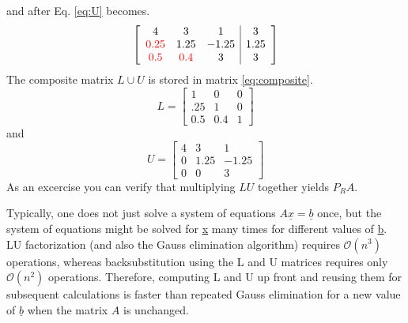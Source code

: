 \documentclass[12pt]{article}   %
\begin{document}
and after Eq. \ref{eq:U} becomes.
\begin{equation}
\left[
\begin{array}{ccc|c}
4 & 3 & 1 & 3 \\
{\color{red}0.25} & 1.25 & -1.25 & 1.25 \\
{\color{red}0.5} & {\color{red}0.4} & 3 & 3
\end{array}
\right]
\label{eq:composite}
\end{equation}
The composite matrix $L\cup U$ is stored in matrix \ref{eq:composite}.
\begin{equation}
L=\begin{bmatrix}
1 & 0 & 0 \\
.25 & 1 & 0 \\
0.5 & 0.4 & 1
\end{bmatrix}
\end{equation}
and
\begin{equation}
U=\left[
\begin{array}{ccc}
4 & 3 & 1 \\
0 & 1.25 & -1.25\\
0 & 0 & 3
\end{array}
\right]
\label{eq:U2}
\end{equation}
As an excercise you can verify that multiplying $LU$ together yields $P_RA$.

Typically, one does not just solve a system of equations $A\underline{x}=\underline{b}$ once, but the system of equations might be solved for \underline{x} many times for different values of \underline{b}. LU  factorization (and also the Gauss elimination algorithm) requires $\mathcal{O}(n^3)$ operations, whereas backsubstitution using the L and U matrices requires only $\mathcal{O}(n^2)$ operations. Therefore, computing L and U up front and reusing them for subsequent calculations is faster than repeated Gauss elimination for a new value of $\underline{b}$ when the matrix $A$ is unchanged. 
\end{document}
